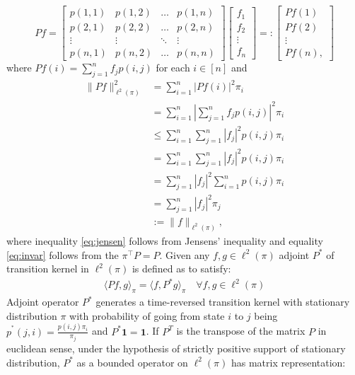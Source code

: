 \documentclass[preprint]{imsart}
\theoremstyle{plain}
\theoremstyle{definition}
\begin{document}
\[
Pf=
\begin{bmatrix}
        p(1,1) & p(1,2) & \ldots &  p(1,n) \\    
        p(2,1) & p(2,2) & \ldots &  p(2,n) \\ 
        \vdots & \vdots & \ddots & \vdots  \\ 
        p(n,1) & p(n,2) & \ldots & p(n,n)   
\end{bmatrix}
\begin{bmatrix}
    f_{1} \\ f_{2} \\ \vdots \\ f_{n}
\end{bmatrix}
=:
\begin{bmatrix}
    Pf(1) \\ Pf(2) \\ \vdots \\ Pf(n),
\end{bmatrix}
\]
where $Pf(i)=\sum_{j=1}^{n}f_{j}p(i,j)$ for each $i \in [n]$ and
\begin{align}
\|Pf\|_{\ell^{2}(\pi)}^{2} & \nonumber =\sum_{i=1}^{n}|Pf(i)|^{2}\pi_{i}\\&\nonumber=\sum_{i=1}^{n}|\sum_{j=1}^{n}f_{j}p(i,j)|^{2}\pi_{i} \\ & \label{eq:jensen}\leq \sum_{i=1}^{n}\sum_{j=1}^{n}|f_{j}|^{2}p(i,j)\pi_{i}\\ & \nonumber=\sum_{i=1}^{n}\sum_{j=1}^{n}|f_{j}|^{2}p(i,j)\pi_{i} \\ & \nonumber=\sum_{j=1}^{n}|f_{j}|^{2}\sum_{i=1}^{n}p(i,j)\pi_{i} \\ & \label{eq:invar} =\sum_{j=1}^{n}|f_{j}|^{2}\pi_{j} \\ & \nonumber :=\|f\|_{\ell^{2}(\pi)}, 
\end{align}
where inequality \ref{eq:jensen} follows from Jensens' inequality and equality \ref{eq:invar} follows from the $\pi^{\top}P=P$. Given any $f,g \in \ell^{2}(\pi)$ adjoint $P^{*}$ of transition kernel in $\ell^{2}(\pi)$ is defined as to satisfy:  
\begin{align}
    \langle Pf,g\rangle_{\pi} = \langle f,P^{*}g\rangle_{\pi} \quad \forall f,g \in \ell^{2}(\pi)
\end{align}
Adjoint operator $P^{*}$ generates a time-reversed transition kernel with stationary distribution $\pi$ with probability of going from state $i$ to $j$ being $p^{^{*}}(j,i)=\frac{p(i,j)\pi_i}{\pi_j}$ and $P^{*}\mathbf{1}=\mathbf{1}$. If $P^{T}$ is the transpose of the matrix $P$ in euclidean sense, under the hypothesis of strictly positive support of stationary distribution, $P^{*}$ as a bounded operator on $\ell^{2}(\pi)$ has matrix representation:   
\end{document}
